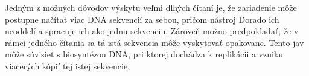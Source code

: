 Jedným z možných dôvodov výskytu veľmi dlhých čítaní je, že zariadenie môže postupne načítať viac 
DNA sekvencií za sebou, pričom nástroj Dorado ich neoddelí a spracuje ich ako jednu sekvenciu.
Zároveň možno predpokladať, že v rámci jedného čítania sa tá istá sekvencia môže vyskytovať opakovane.
Tento jav môže súvisieť s biosyntézou DNA, pri ktorej dochádza k replikácii a vzniku viacerých kópií tej istej sekvencie.
